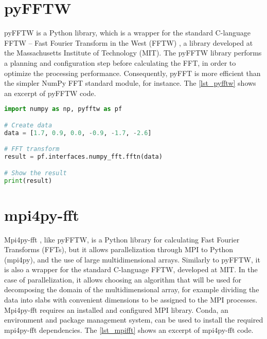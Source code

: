 %
%
%
\section{pyFFTW}
\label{sec_apprfftw}

pyFFTW \cite {Gomersall2021} is a Python library, which is a wrapper for the standard C-language FFTW – Fast Fourier Transform in the West (FFTW) \cite {Frigo1998}, a library developed at the Massachusetts Institute of Technology (MIT). The pyFFTW library performs a planning and configuration step before calculating the FFT, in order to optimize the processing performance. Consequently, pyFFT is more efficient than the simpler NumPy FFT standard module, for instance. The \autoref {lst_pyfftw} shows an excerpt of pyFFTW code.

\begin{lstlisting}[float=htb, language={Python}, label={lst_pyfftw}, caption={Excerpt of pyFFTW code.}]
import numpy as np, pyfftw as pf

# Create data
data = [1.7, 0.9, 0.0, -0.9, -1.7, -2.6]

# FFT transform
result = pf.interfaces.numpy_fft.fftn(data)

# Show the result
print(result)
\end{lstlisting}

%
%
%
\section{mpi4py-fft}
\label{sec_apprmfft}

Mpi4py-fft \cite {Mortensen2019}, like pyFFTW, is a Python library for calculating Fast Fourier Transforms (FFTs), but it allows parallelization through MPI to Python (mpi4py), and the use of large multidimensional arrays. Similarly to pyFFTW, it is also a wrapper for the standard C-language FFTW, developed at MIT. In the case of parallelization, it allows choosing an algorithm that will be used for decomposing the domain of the multidimensional array, for example dividing the data into slabs with convenient dimensions to be assigned to the MPI processes. Mpi4py-fft requires an installed and configured MPI library. Conda, an environment and package management system, can be used to install the required mpi4py-fft dependencies. The \autoref {lst_mpifft} shows an excerpt of mpi4py-fft code.

